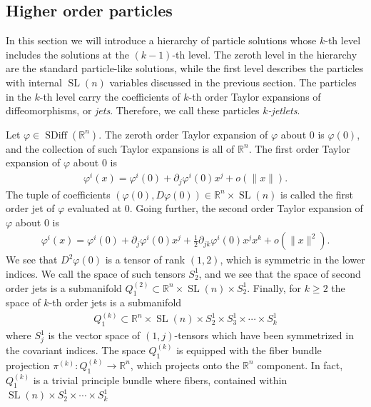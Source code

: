 \documentclass[12pt]{amsart}
\newcommand{\R}{\ensuremath{\mathbb{R}}}
\DeclareMathOperator{\SDiff}{SDiff}
\DeclareMathOperator{\SL}{SL}
\begin{document}
  \subsection{Higher order particles}
  \label{sec:higher_order}
  In this section we will introduce a hierarchy of particle solutions whose $k$-th level includes the solutions at the $(k-1)$-th level.
  The zeroth level in the hierarchy are the standard particle-like solutions,
  while the first level describes the particles with internal $\SL(n)$ variables
  discussed in the previous section.
  The particles in the $k$-th level carry the coefficients of
  $k$-th order Taylor expansions of diffeomorphisms,
  or \emph{jets}.
  Therefore, we call these particles \emph{$k$-jetlets}.

  Let $\varphi \in \SDiff(\R^n)$.
  The zeroth order Taylor expansion of $\varphi$ about $0$
  is $\varphi(0)$, and the collection of such Taylor
  expansions is all of $\R^n$.
  The first order Taylor expansion of $\varphi$ about $0$ is
  \begin{align*}
    \varphi^i( x) = \varphi^i(0) + \partial_j \varphi^i(0) x^j + o( \|x\|).
  \end{align*}
  The tuple of coefficients $(\varphi(0) , D\varphi(0) ) \in \R^n \times \SL(n)$ is
  called the first order jet of $\varphi$ evaluated at $0$.
  Going further, the second order Taylor expansion of $\varphi$ about $0$
  is
  \begin{align*}
    \varphi^i(x) = \varphi^i(0) + \partial_j \varphi^i(0) x^j + 
    \frac{1}{2} \partial_{jk} \varphi^i(0) x^j x^k + o( \| x\|^2).
  \end{align*}
  We see that $D^2\varphi(0)$ is a tensor of rank $(1,2)$, which is
  symmetric in the lower indices.
  We call the space of such tensors $S^1_2$,
  and we see that the space of second order jets is a submanifold $Q^{(2)}_1 \subset \R^n \times \SL(n) \times S^1_2$.
  Finally, for $k \geq 2$ the space of $k$-th order jets is a submanifold
  \begin{align*}
    Q_1^{(k)} \subset \R^n \times \SL(n) \times S^1_2 \times S^1_3 \times \cdots\times S^1_k
  \end{align*}
  where $S^1_j$ is the vector space of $(1,j)$-tensors which
  have been symmetrized in the covariant indices.
  The space $Q_1^{(k)}$ is equipped with the fiber bundle
  projection $\pi^{(k)} : Q_1^{(k)} \to \R^n$,
  which projects onto the $\R^n$ component.
  In fact, $Q_1^{(k)}$ is a trivial principle bundle
  where fibers, contained within $\SL(n) \times S^1_2 \times \cdots \times S^1_k$
\end{document}
